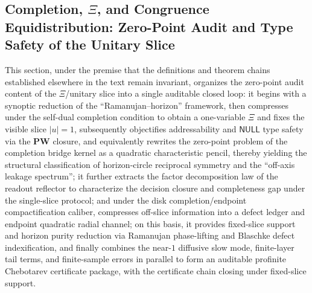 \subsection{Completion, \texorpdfstring{$\Xi$}{Xi}, and Congruence Equidistribution: Zero-Point Audit and Type Safety of the Unitary Slice}\label{subsec:xi-completion-audit}
This section, under the premise that the definitions and theorem chains established elsewhere in the text remain invariant, organizes the zero-point audit content of the \(\Xi\)/unitary slice into a single auditable closed loop: it begins with a synoptic reduction of the ``Ramanujan--horizon'' framework, then compresses under the self-dual completion condition to obtain a one-variable \(\Xi\) and fixes the visible slice \(|u|=1\), subsequently objectifies addressability and \(\mathsf{NULL}\) type safety via the \(\mathbf{PW}\) closure, and equivalently rewrites the zero-point problem of the completion bridge kernel as a quadratic characteristic pencil, thereby yielding the structural classification of horizon-circle reciprocal symmetry and the ``off-axis leakage spectrum''; it further extracts the factor decomposition law of the readout reflector to characterize the decision closure and completeness gap under the single-slice protocol; and under the disk completion/endpoint compactification caliber, compresses off-slice information into a defect ledger and endpoint quadratic radial channel; on this basis, it provides fixed-slice support and horizon purity reduction via Ramanujan phase-lifting and Blaschke defect indexification, and finally combines the near-\(1\) diffusive slow mode, finite-layer tail terms, and finite-sample errors in parallel to form an auditable profinite Chebotarev certificate package, with the certificate chain closing under fixed-slice support.

